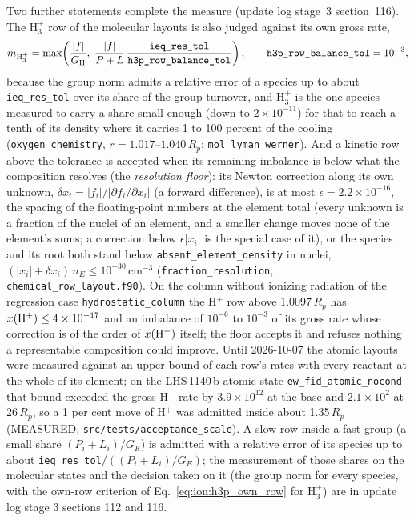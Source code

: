 Two further statements complete the measure (update log stage~3
section~116). The H$_3^+$ row of the molecular layouts is also judged against
its own gross rate,
\begin{equation}
m_{\rm H_3^+} = \max\!\left(\frac{|f|}{G_{\rm H}},\;
\frac{|f|}{P+L}\,\frac{\texttt{ieq\_res\_tol}}{\texttt{h3p\_row\_balance\_tol}}\right),
\qquad \texttt{h3p\_row\_balance\_tol} = 10^{-3},
\label{eq:ion:h3p_own_row}
\end{equation}
because the group norm admits a relative error of a species up to about
\texttt{ieq\_res\_tol} over its share of the group turnover, and H$_3^+$ is
the one species measured to carry a share small enough (down to
$2\times10^{-11}$) for that to reach a tenth of its density where it carries
1 to 100 percent of the cooling (\texttt{oxygen\_chemistry}, $r =
1.017$--$1.040\,R_p$; \texttt{mol\_lyman\_werner}). And a kinetic row above
the tolerance is accepted when its remaining imbalance is below what the
composition resolves (the \emph{resolution floor}): its Newton correction
along its own unknown, $\delta x_i = |f_i|/|\partial f_i/\partial x_i|$
(a forward difference), is at most $\epsilon = 2.2\times10^{-16}$, the spacing
of the floating-point numbers at the element total (every unknown is a
fraction of the nuclei of an element, and a smaller change moves none of the
element's sums; a correction below $\epsilon|x_i|$ is the special case of
it), or the species and its root both stand below
\texttt{absent\_element\_density} in nuclei, $(|x_i|+\delta x_i)\,n_E \le
10^{-30}$\,cm$^{-3}$ (\texttt{fraction\_resolution},
\texttt{chemical\_row\_layout.f90}). On the column without ionizing radiation
of the regression case \texttt{hydrostatic\_column} the H$^+$ row above
$1.0097\,R_p$ has $x({\rm H^+}) \le 4\times10^{-17}$ and an imbalance of
$10^{-6}$ to $10^{-3}$ of its gross rate whose correction is of the order of
$x({\rm H^+})$ itself; the floor accepts it and refuses nothing a
representable composition could improve. Until 2026-10-07 the atomic
layouts were measured against an upper bound of each row's rates with every
reactant at the whole of its element; on the LHS\,1140\,b atomic state
\texttt{ew\_fid\_atomic\_nocond} that bound exceeded the gross H$^+$ rate by
$3.9\times10^{12}$ at the base and $2.1\times10^{2}$ at 26\,$R_p$, so a 1 per
cent move of H$^+$ was admitted inside about 1.35\,$R_p$ (MEASURED,
\texttt{src/tests/acceptance\_scale}). A slow row inside a fast group (a
small share $(P_i+L_i)/G_E$) is admitted with a relative error of its species
up to about \texttt{ieq\_res\_tol}$/((P_i+L_i)/G_E)$; the measurement of those
shares on the molecular states and the decision taken on it (the group norm for
every species, with the own-row criterion of
Eq.~\eqref{eq:ion:h3p_own_row} for H$_3^+$) are in update log stage 3
sections 112 and 116.

